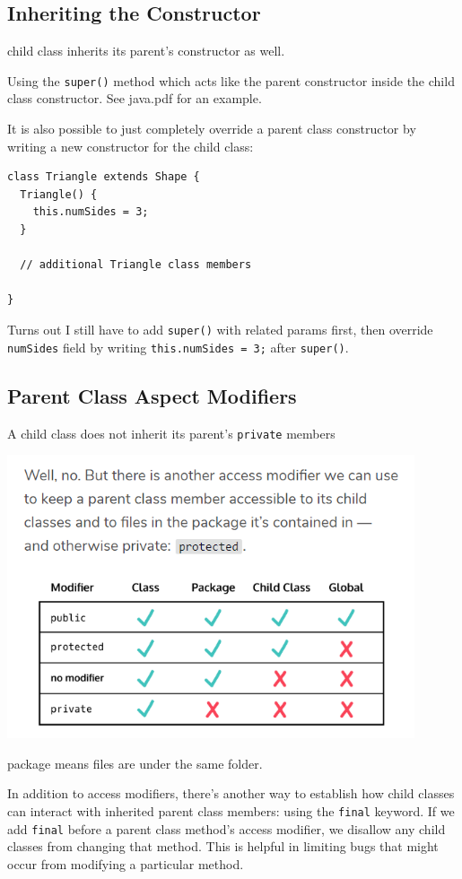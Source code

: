 \documentclass[a4paper, 12pt]{article}
\begin{document}
\subsection{Inheriting the Constructor}
child class inherits its parent's constructor as well. 

Using the \verb|super()| method which acts like the parent constructor inside the child class constructor. See java.pdf for an example.

It is also possible to just completely override a parent class constructor by writing a new constructor for the child class:
\begin{verbatim}
class Triangle extends Shape {
  Triangle() {
    this.numSides = 3;
  }

  // additional Triangle class members

}
\end{verbatim}
Turns out I still have to add \verb|super()| with related params first, then override \verb|numSides| field by writing \verb|this.numSides = 3;| after \verb|super()|.

\subsection{Parent Class Aspect Modifiers}
A child class does not inherit its parent's \verb|private| members

\includegraphics[width=12cm]{pics/accessModifiers.png}

package means files are under the same folder.

In addition to access modifiers, there's another way to establish how child classes can interact with inherited parent class members: using the \verb|final| keyword. If we add \verb|final| before a parent class method's access modifier, we disallow any child classes from changing that method. This is helpful in limiting bugs that might occur from modifying a particular method.
\end{document}
